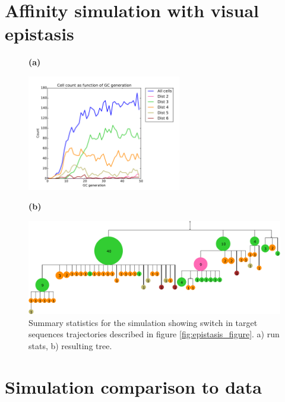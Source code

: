 \section{Affinity simulation with visual epistasis}
\begin{figure}[!ht]
    \textbf{(a)}
    \vspace{-15mm}
    \begin{center}
    \includegraphics[width=0.6\textwidth]{figures/epi_runstats.pdf}
    \end{center}
    \textbf{(b)}
    \vspace{-15mm}
    \begin{center}
    \includegraphics[width=1\textwidth]{figures/epi_collapsed_tree_runstats.pdf}
    \end{center}
    \caption{
        \label{fig:collapsed_epistasis}
        Summary statistics for the simulation showing switch in target sequences trajectories described in figure \ref{fig:epistasis_figure}. a) run stats, b) resulting tree.
        }
\end{figure}






\section{Simulation comparison to data}

